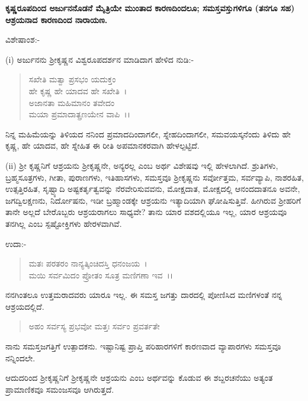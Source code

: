 \begin{center}
\textbf{ಕೃಷ್ಣರೂಪದಿಂದ ಅರ್ಜುನನೊಡನೆ ಮೈತ್ರಿಯೇ ಮುಂತಾದ ಕಾರಣದಿಂದಲೂ; ಸಮಸ್ತವಸ್ತುಗಳಿಗೂ (ತನಗೂ ಸಹ) ಆಶ್ರಯನಾದ ಕಾರಣದಿಂದ ನಾರಾಯಣ.}
\end{center}

\noindent
ವಿಶೇಷಾಂಶ:-

(i) ಅರ್ಜುನನು ಶ‍್ರೀಕೃಷ್ಣನ ವಿಶ್ವರೂಪದರ್ಶನ ಮಾಡಿದಾಗ ಹೇಳಿದ ನುಡಿ:-

\begin{verse}
ಸಖೇತಿ ಮತ್ವಾ ಪ್ರಸಭಂ ಯದುಕ್ತಂ\\ ಹೇ ಕೃಷ್ಣ ಹೇ ಯಾದವ ಹೇ ಸಖೇತಿ~।\\ ಅಜಾನತಾ ಮಹಿಮಾನಂ ತವೇದಂ\\ ಮಯಾ ಪ್ರಮಾದಾತ್ಪ್ರಣಯೇನ ವಾಪಿ~।।
\end{verse}


ನಿನ್ನ ಮಹಿಮೆಯನ್ನು ತಿಳಿಯದ ನನಿಂದ ಪ್ರಮಾದದಿಂದಾಗಲೀ, ಸ್ನೇಹದಿಂದಾಗಲೀ, ಸಮವಯಸ್ಕನೆಂದು ತಿಳಿದು ಹೇ ಕೃಷ್ಣ, ಹೇ ಯಾದವ, ಹೇ ಸ್ನೇಹಿತ ಈ ರೀತಿ ಅಪಮಾನಕರವಾಗಿ ಹೇಳಲ್ಪಟ್ಟಿದೆ.

(ii) ಶ‍್ರೀ ಕೃಷ್ಣನಿಗೆ ಆಶ್ರಯನು ಶ‍್ರೀಕೃಷ್ಣನೇ, ಅನ್ಯರಲ್ಲ ಎಂಬ ಅರ್ಥ ವಿಶೇಷವು ಇಲ್ಲಿ ಹೇಳಲಾಗಿದೆ. ಶ್ರುತಿಗಳು, ಬ್ರಹ್ಮಸೂತ್ರಗಳು, ಗೀತಾ, ಪುರಾಣಗಳು, ಇತಿಹಾಸಗಳು, ಸಮಸ್ತವೂ ಶ‍್ರೀಕೃಷ್ಣನು ಸರ್ವೋತ್ತಮ, ಸರ್ವವ್ಯಾಪಿ, ನಾಶರಹಿತ, ಉತ್ಸತ್ತಿರಹಿತ, ಸೃಷ್ಟ್ಯಾದಿ ಅಷ್ಟಕರ್ತೃತ್ವವನ್ನು ನೆರವೇರಿಸುವವನು, ಮೋಕ್ಷದಾತ, ಮೋಕ್ಷದಲ್ಲಿ ಆನಂದದಾತನೂ ಅವನೇ, ಜಗದ್ವಿಲಕ್ಷಣನು, ನಿರ್ದೋಷನು, ಇಡೀ ಬ್ರಹ್ಮಾಂಡಕ್ಕೇ ಆಶ್ರಯನು ಇತ್ಯಾದಿಯಾಗಿ ಘೋಷಿಸುತ್ತಿವೆ. ಹೀಗಿರುವ ಶ‍್ರೀಹರಿಗೆ ತಾನೇ ಅಲ್ಲದೆ ಬೇರೊಬ್ಬರು ಆಶ್ರಯರಾಗಲು ಸಾಧ್ಯವೇ? ತಾನು ಯಾರ ವಶದಲ್ಲಿಯೂ ಇಲ್ಲ, ಯಾರ ಆಶ್ರಯವೂ ತನಗಿಲ್ಲ ಎಂಬ ಸ್ಪಷ್ಟೋಕ್ತಿಗಳು ಹೇರಳವಾಗಿವೆ.

ಉದಾ:-

\begin{verse}
ಮತಃ ಪರತರಂ ನಾನ್ಯತ್ಕಿಂಚಿದಸ್ತಿ ಧನಂಜಯ~।\\ ಮಯಿ ಸರ್ವಮಿದಂ ಪ್ರೋತಂ ಸೂತ್ರ ಮಣಿಗಣಾ ಇವ~।।
\end{verse}


ನನಗಿಂತಲೂ ಉತ್ತಮರಾದವರು ಯಾರೂ ಇಲ್ಲ. ಈ ಸಮಸ್ತ ಜಗತ್ತು ದಾರದಲ್ಲಿ ಪೋಣಿಸಿದ ಮಣಿಗಳಂತೆ ನನ್ನ ಆಶ್ರಯದಲ್ಲಿದೆ.

\begin{verse}
ಅಹಂ ಸರ್ವಸ್ಯ ಪ್ರಭವೋ ಮತ್ತಃ ಸರ್ವಂ ಪ್ರವರ್ತತೇ
\end{verse}


ನಾನು ಸಮಸ್ತಜಗತ್ತಿಗೆ ಉತ್ಪಾದಕನು. ಇಷ್ಟಾನಿಷ್ಟ ಪ್ರಾಪ್ತಿ ಪರಿಹಾರಗಳಿಗೆ ಕಾರಣವಾದ ವ್ಯಾಪಾರಗಳು ಸಮಸ್ತವೂ ನನ್ನಿಂದಲೇ.

ಆದುದರಿಂದ ಶ‍್ರೀಕೃಷ್ಣನಿಗೆ ಶ‍್ರೀಕೃಷ್ಣನೇ ಆಶ್ರಯನು ಎಂಬ ಅರ್ಥವನ್ನು ಕೊಡುವ ಈ ಶಬ್ದರಚನೆಯು ಅತ್ಯಂತ ಪ್ರಾಮಾಣಿಕವೂ ಸಮಂಜಸವೂ ಆಗಿರುತ್ತದೆ.

